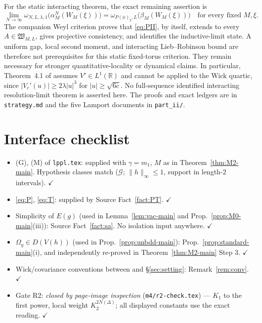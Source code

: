 \documentclass[11pt,a4paper]{article}
\theoremstyle{plain}
\theoremstyle{definition}
\newcommand{\G}{\mathcal{G}}
\newcommand{\Om}{\Omega}
\begin{document}
For the static interacting theorem, the exact remaining assertion is
\[
 \lim_{N\to\infty}
 \omega_{N,L,\lambda,1}\bigl(\alpha_M^N(W_M(\xi))\bigr)
 =
 \omega_{P(\phi)_2,L}\bigl(\beta_M(W_M(\xi))\bigr)
 \quad\text{for every fixed }M,\xi.                              \tag{PII}\label{eq:PII}
\]
The companion Weyl criterion proves that \eqref{eq:PII}, by itself, extends to every
$A\in\mathfrak W_{M,L}$, gives projective consistency, and identifies the
inductive-limit state.  A uniform gap, local second moment, and interacting
Lieb--Robinson bound are therefore not prerequisites for this static fixed-torus
criterion.  They remain necessary for stronger quantitative-locality or dynamical
claims.  In particular, Theorem~4.1 of \cite{NRSS} assumes $V'\in L^1(\mathbb R)$
and cannot be applied to the Wick quartic, since
$|V_c'(u)|\ge2\lambda|u|^3$ for $|u|\ge\sqrt{6c}$.
No full-sequence identified interacting resolution-limit theorem is asserted here.
The proofs and exact ledgers are in \texttt{strategy.md} and the five Lamport documents
in \texttt{part\_ii/}.

\appendix
\section{Interface checklist}\label{app:checklist}

\begin{itemize}
\item (G), (M) of \texttt{lppl.tex}: supplied with $\gamma=m_1$, $M$ as in
      Theorem~\ref{thm:M2-main}. Hypothesis classes match ($\G$; $\|h\|_\infty\le1$, support in
      length-$2$ intervals). $\checkmark$
\item \eqref{eq:P}, \eqref{eq:T}: supplied by Source Fact~\ref{fact:PT}. $\checkmark$
\item Simplicity of $E(g)$ (used in Lemma~\ref{lem:vac-main} and
      Prop.~\ref{prop:M0-main}(iii)): Source Fact~\ref{fact:sa}. No isolation input anywhere.
      $\checkmark$
\item $\Om_g\in D(V(h))$ (used in Prop.~\ref{prop:unbdd-main}):
      Prop.~\ref{prop:standard-main}(i), and independently re-proved in
      Theorem~\ref{thm:M2-main} Step 3. $\checkmark$
\item Wick/covariance conventions between \cite{GJS} and \S\ref{sec:setting}:
      Remark~\ref{rem:conv}. $\checkmark$
\item Gate R2: \emph{closed by page-image inspection} (\texttt{m4/r2-check.tex}) ---
      $K_1$ to the first power, local weight $K_2^{2N(\Delta)}$; all displayed constants use
      the exact reading. $\checkmark$
\end{itemize}
\end{document}
